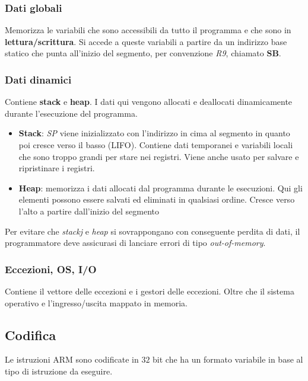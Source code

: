 \subsubsection{Dati globali}
Memorizza le variabili che sono accessibili da tutto il programma e che sono in \textbf{lettura/scrittura}. Si accede a queste variabili a partire da un indirizzo base statico che punta all'inizio del segmento, per convenzione \textit{R9}, chiamato \textbf{SB}.
\subsubsection{Dati dinamici}
Contiene \textbf{stack} e \textbf{heap}. I dati qui vengono allocati e deallocati dinamicamente durante l'esecuzione del programma.
\begin{itemize}
	\item \textbf{Stack}: \textit{SP} viene inizializzato con l'indirizzo in cima al segmento in quanto poi cresce verso il basso (LIFO). Contiene dati temporanei e variabili locali che sono troppo grandi per stare nei registri. Viene anche usato per salvare e ripristinare i registri.
	\item \textbf{Heap}: memorizza i dati allocati dal programma durante le esecuzioni. Qui gli elementi possono essere salvati ed eliminati in qualsiasi ordine. Cresce verso l'alto a partire dall'inizio del segmento
\end{itemize}
Per evitare che \textit{stackj} e \textit{heap} si sovrappongano con conseguente perdita di dati, il programmatore deve assicurasi di lanciare errori di tipo \textit{out-of-memory}.
\subsubsection{Eccezioni, OS, I/O}
Contiene il vettore delle eccezioni e i gestori delle eccezioni. Oltre che il sistema operativo e l'ingresso/uscita mappato in memoria.

\subsection{Codifica}
Le istruzioni ARM sono codificate in $32$ bit che ha un formato variabile in base al tipo di istruzione da eseguire.
